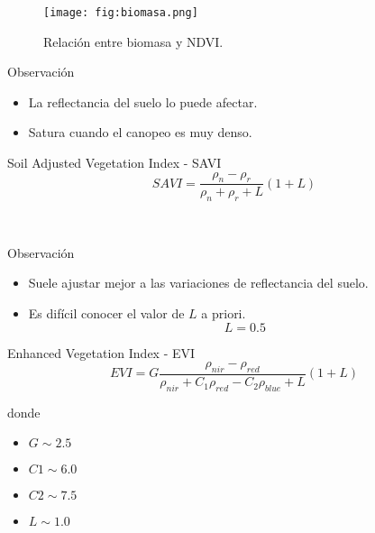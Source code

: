 
\begin{frame}{}
  \begin{figure}
    \centering
    \texttt{[image: fig:biomasa.png]}
    \caption{Relación entre biomasa y NDVI.}
    \label{}
  \end{figure}
\end{frame}
\begin{frame}
\begin{block}{Observación}
    \begin{itemize}[<+->]
        \item La reflectancia del suelo lo puede afectar.
        \item Satura cuando el canopeo es muy denso.
    \end{itemize}
\end{block}
\end{frame}


\begin{frame}{}
    \begin{block}{Soil Adjusted Vegetation Index - SAVI}
        \begin{equation}
            SAVI = \frac{\rho_n-\rho_r}{\rho_n+\rho_r+L}(1+L)
        \end{equation}
    \end{block}\pause\
    \begin{block}{Observación}
        \begin{itemize}
            \item Suele ajustar mejor a las variaciones de reflectancia del
                suelo.
            \item Es difícil conocer el valor de $L$ a priori. \begin{equation}
        L=0.5
    \end{equation}
        \end{itemize}
    \end{block}
\end{frame}

\begin{frame}{}
    \begin{block}{Enhanced Vegetation Index - EVI}
        \begin{equation}
            EVI = G\frac{\rho_{nir} - \rho_{red}}{\rho_{nir}+C_1\rho_{red}-C_2\rho_{blue}+L}(1+L)
        \end{equation}
    \end{block}
    donde
    \begin{itemize}
        \item $G  \sim 2.5$
        \item $C1 \sim 6.0$
        \item $C2 \sim 7.5$
        \item $L  \sim 1.0$
    \end{itemize}
\end{frame}

\gracias
